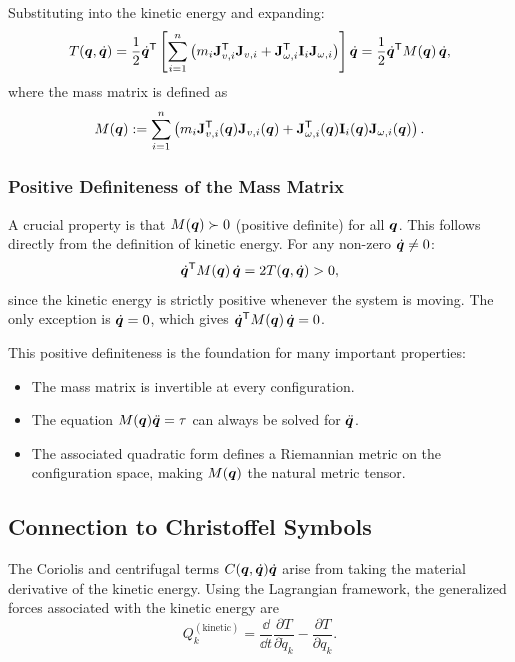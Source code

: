 Substituting into the kinetic energy and expanding:
\begin{equation}
T(\bm{q},\dot{\bm{q}}) = \frac{1}{2}\dot{\bm{q}}^{\mathsf{T}} \left[
\sum_{i=1}^n \left( m_i \mathbf{J}_{v,i}^{\mathsf{T}}\mathbf{J}_{v,i}
+ \mathbf{J}_{\omega,i}^{\mathsf{T}} \mathbf{I}_i \mathbf{J}_{\omega,i} \right)
\right] \dot{\bm{q}}
= \frac{1}{2}\dot{\bm{q}}^{\mathsf{T}} M(\bm{q})\,\dot{\bm{q}},
\label{eq:ch3:mass-matrix-def}
\end{equation}
where the mass matrix is defined as
\begin{equation}
M(\bm{q}) := \sum_{i=1}^n \left( m_i \mathbf{J}_{v,i}^{\mathsf{T}}(\bm{q})\mathbf{J}_{v,i}(\bm{q})
+ \mathbf{J}_{\omega,i}^{\mathsf{T}}(\bm{q}) \mathbf{I}_i(\bm{q}) \mathbf{J}_{\omega,i}(\bm{q}) \right).
\label{eq:ch3:mass-matrix-explicit}
\end{equation}

\subsubsection*{Positive Definiteness of the Mass Matrix}

A crucial property is that $M(\bm{q}) \succ 0$ (positive definite) for all $\bm{q}$. This follows
directly from the definition of kinetic energy. For any non-zero $\dot{\bm{q}} \neq 0$:
\begin{equation}
\dot{\bm{q}}^{\mathsf{T}} M(\bm{q})\,\dot{\bm{q}} = 2T(\bm{q},\dot{\bm{q}}) > 0,
\end{equation}
since the kinetic energy is strictly positive whenever the system is moving. The only exception
is $\dot{\bm{q}} = 0$, which gives $\dot{\bm{q}}^{\mathsf{T}} M(\bm{q})\,\dot{\bm{q}} = 0$.

This positive definiteness is the foundation for many important properties:
\begin{itemize}
\item The mass matrix is invertible at every configuration.
\item The equation $M(\bm{q})\ddot{\bm{q}} = \tau$ can always be solved for $\ddot{\bm{q}}$.
\item The associated quadratic form defines a Riemannian metric on the configuration space,
      making $M(\bm{q})$ the natural metric tensor.
\end{itemize}

\subsection{Connection to Christoffel Symbols}

The Coriolis and centrifugal terms $C(\bm{q},\dot{\bm{q}})\dot{\bm{q}}$ arise from taking the material
derivative of the kinetic energy. Using the Lagrangian framework, the generalized forces
associated with the kinetic energy are
\begin{equation}
Q_k^{(\text{kinetic})} = \frac{\dd}{\dd t}\frac{\partial T}{\partial \dot q_k}
- \frac{\partial T}{\partial q_k}.
\end{equation}

